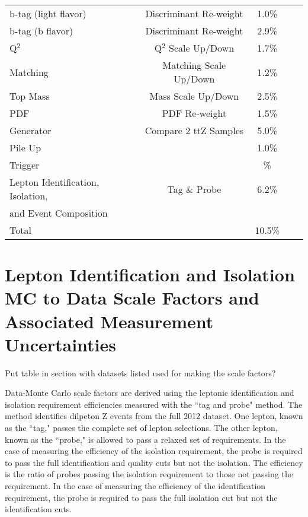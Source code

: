 \begin{table}[h]
\begin{center}
\begin{tabular}{lcccc}
b-tag (light flavor)                          & Discriminant Re-weight                              & 1.0\%       	\\
b-tag (b flavor)		                      & Discriminant Re-weight                              & 2.9\%	\\	
Q$^2$                                         & Q$^2$ Scale Up/Down                                 & 1.7\% \\
Matching                                      & Matching Scale Up/Down                              & 1.2\% \\
Top Mass                                      & Mass Scale Up/Down                                  & 2.5\% \\
PDF				                              & PDF Re-weight                                       & 1.5\%	\\
Generator                                     & Compare 2 ttZ Samples                               & 5.0\% \\
Pile Up                                       &                                                     & 1.0\% \\
Trigger                                       &                                                     & \lt 1\% \\
Lepton Identification, Isolation,             & Tag \& Probe                                        & 6.2\% \\
and Event Composition  & & \\
\hline
Total 					                                                                             & & 10.5\% 	\\
\hline
\end{tabular}
\end{center}
\end{table}

\section{Lepton Identification and Isolation MC to Data Scale Factors and Associated Measurement Uncertainties}
\label{sec:tag_and_probe}

Put table in section with datasets listed used for making the scale factors?


Data-Monte Carlo scale factors are derived using the leptonic identification and isolation requirement efficiencies measured with the ``tag and probe" method. The method identifies dilpeton Z events from the full 2012 dataset. One lepton, known as the ``tag," passes the complete set of lepton selections. The other lepton, known as the ``probe," is allowed to pass a relaxed set of requirements. In the case of measuring the efficiency of the isolation requirement, the probe is required to pass the full identification and quality cuts but not the isolation. The efficiency is the ratio of probes passing the isolation requirement to those not passing the requirement. In the case of measuring the efficiency of the identification requirement, the probe is required to pass the full isolation cut but not the identification cuts. \\

